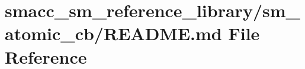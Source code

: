 \hypertarget{smacc__sm__reference__library_2sm__atomic__cb_2README_8md}{}\section{smacc\+\_\+sm\+\_\+reference\+\_\+library/sm\+\_\+atomic\+\_\+cb/\+R\+E\+A\+D\+ME.md File Reference}
\label{smacc__sm__reference__library_2sm__atomic__cb_2README_8md}
